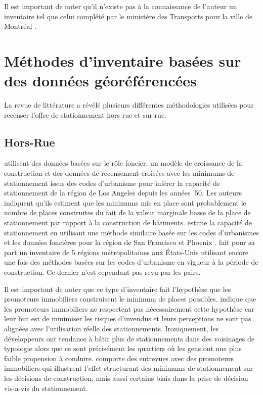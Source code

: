 Il est important de noter qu'il n'existe pas à la connaissance de l'auteur un inventaire tel que celui complété par le ministère des Transports pour la ville de Montréal \parencite{ConsortiumCIMA+-DanielArbouretassocies:InventaireEspaces:1998}.

\section{Méthodes d'inventaire basées sur des données géoréférencées}
La revue de littérature a révélé plusieurs différentes méthodologies utilisées pour recenser l'offre de stationnement hors rue et sur rue. 

\subsection{Hors-Rue}
\textcite{Chester:ParkingInfrastructure:2015} utilisent des données basées sur le rôle foncier, un modèle de croissance de la construction et des données de recensement croisées avec les minimums de stationnement issus des codes d'urbanisme pour inférer la capacité de stationnement de la région de Los Angeles depuis les années '50. Les auteurs indiquent qu'ils estiment que les minimums mis en place sont probablement le nombre de places construites du fait de la valeur marginale basse de la place de stationnement par rapport à la construction de bâtiments. \citeauthor{Chester:InventoryingSan:2022} estime la capacité de stationnement en utilisant une méthode similaire basée sur les codes d'urbanismes et les données foncières pour la région de San Francisco \parencite{Chester:InventoryingSan:2022} et Phoenix \parencite{Hoehne:ValleySundrenched:2019}. \textcite{Scharnhorst:QuantifiedParking:2018} fait pour sa part un inventaire de 5 régions métropolitaines aux États-Unis utilisant encore une fois des méthodes basées sur les codes d'urbanisme en vigueur à la période de construction. Ce dernier n'est cependant pas revu par les pairs. \par 
Il est important de noter que ce type d'inventaire fait l'hypothèse que les promoteurs immobiliers construisent le minimum de places possibles. \textcite{Stangl:ParkingLots:2019} indique que les promoteurs immobiliers ne respectent pas nécessairement cette hypothèse car leur but est de minimiser les risques d'invendus et leurs perceptions ne sont pas alignées avec l'utilisation réelle des stationnements. Ironiquement, les développeurs ont tendance à bâtir plus de stationnements dans des voisinages de typologie  \fg{} \parencite{Voulgaris:SynergisticNeighborhood:2017} alors que ce sont précisément les quartiers où les gens ont une plus faible propension à conduire. \textcite{Stangl:ParkingLots:2019} comporte des entrevues avec des promoteurs immobiliers qui illustrent l'effet structurant des minimums de stationnement sur les décisions de construction, mais aussi certains biais dans la prise de décision vis-a-vis du stationnement.

